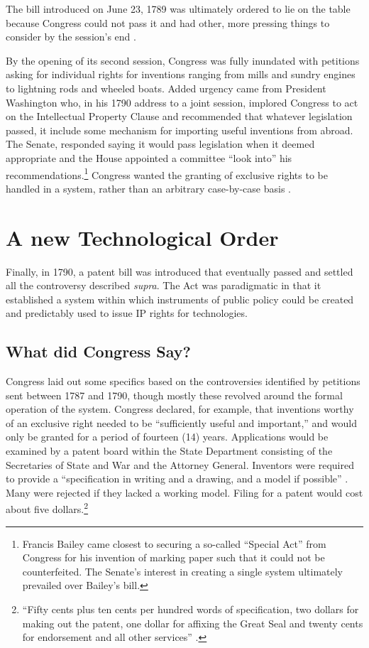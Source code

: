 \documentclass[12pt,letterpaper]{article}
\begin{document}
{The bill introduced on June 23, 1789 was ultimately ordered to lie on the table because Congress could not pass it and had other, more pressing things to consider by the session's end \autocite{Walterscheid1997}.

By the opening of its second session, Congress was fully inundated with petitions asking for individual rights for inventions ranging from mills and sundry engines to lightning rods and wheeled boats. Added urgency came from President Washington who, in his 1790 address to a joint session, implored Congress to act on the Intellectual Property Clause and recommended that whatever legislation passed, it include some mechanism for importing useful inventions from abroad. The Senate, responded saying it would pass legislation when it deemed appropriate and the House appointed a committee ``look into'' his recommendations.\footnote{Francis Bailey came closest to securing a so-called ``Special Act'' from Congress for his invention of marking paper such that it could not be counterfeited. The Senate's interest in creating a single system ultimately prevailed over Bailey's bill.} Congress wanted the granting of exclusive rights to be handled in a system, rather than an arbitrary case-by-case basis \autocite[492-498]{Walterscheid1997}.

\section{A new Technological Order}

Finally, in 1790, a patent bill was introduced that eventually passed and settled all the controversy described \textit{supra}. The Act was paradigmatic in that it established a system within which instruments of public policy could be created and predictably used to issue IP rights for technologies.

\subsection{What did Congress Say?}

Congress laid out some specifics based on the controversies identified by petitions sent between 1787 and 1790, though mostly these revolved around the formal operation of the system. Congress declared, for example, that inventions worthy of an exclusive right needed to be ``sufficiently useful and important,'' and would only be granted for a period of fourteen (14) years. Applications would be examined by a patent board within the State Department consisting of the Secretaries of State and War and the Attorney General. Inventors were required to provide a ``specification in writing and a drawing, and a model if possible'' \autocite[237]{Federico1936}. Many were rejected if they lacked a working model. Filing for a patent would cost about five dollars.\footnote{``Fifty cents plus ten cents per hundred words of specification, two dollars for making out the patent, one dollar for affixing the Great Seal and twenty cents for endorsement and all other services'' \autocite[237]{Federico1936}.}

}
\end{document}
